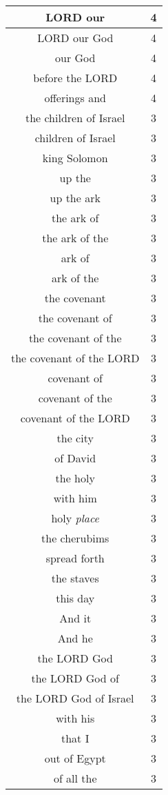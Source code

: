 \begin{center}
\begin{longtable}{|c|c|}
LORD our & 4\\ \hline 
LORD our God & 4\\ \hline 
our God & 4\\ \hline 
before the LORD & 4\\ \hline 
offerings and & 4\\ \hline 
the children of Israel & 3\\ \hline 
children of Israel & 3\\ \hline 
king Solomon & 3\\ \hline 
up the & 3\\ \hline 
up the ark & 3\\ \hline 
the ark of & 3\\ \hline 
the ark of the & 3\\ \hline 
ark of & 3\\ \hline 
ark of the & 3\\ \hline 
the covenant & 3\\ \hline 
the covenant of & 3\\ \hline 
the covenant of the & 3\\ \hline 
the covenant of the LORD & 3\\ \hline 
covenant of & 3\\ \hline 
covenant of the & 3\\ \hline 
covenant of the LORD & 3\\ \hline 
the city & 3\\ \hline 
of David & 3\\ \hline 
the holy & 3\\ \hline 
with him & 3\\ \hline 
holy \emph{place} & 3\\ \hline 
the cherubims & 3\\ \hline 
spread forth & 3\\ \hline 
the staves & 3\\ \hline 
this day & 3\\ \hline 
And it & 3\\ \hline 
And he & 3\\ \hline 
the LORD God & 3\\ \hline 
the LORD God of & 3\\ \hline 
the LORD God of Israel & 3\\ \hline 
with his & 3\\ \hline 
that I & 3\\ \hline 
out of Egypt & 3\\ \hline 
of all the & 3\\ \hline 

\end{longtable}
\end{center}
